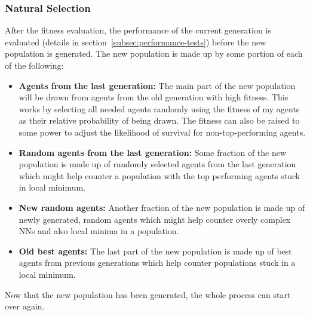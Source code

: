 \documentclass[11pt]{report}
\begin{document}
\begin{enumerate}
    \subsubsection{Natural Selection}
    After the fitness evaluation, the performance of the current generation is evaluated (details in section~\ref{subsec:performance-tests}) before the new population is generated.
    The new population is made up by some portion of each of the following:
    \begin{itemize}
        \item \textbf{Agents from the last generation:}
        The main part of the new population will be drawn from agents from the old generation with high fitness.
        This works by selecting all needed agents randomly using the fitness of my agents as their relative probability of being drawn.
        The fitness can also be raised to some power to adjust the likelihood of survival for non-top-performing agents.
        \item \textbf{Random agents from the last generation:}
        Some fraction of the new population is made up of randomly selected agents from the last generation which might help counter a population with the top performing agents stuck in local minimum.
        \item \textbf{New random agents:}
        Another fraction of the new population is made up of newly generated, random agents which might help counter overly complex NNs and also local minima in a population.
        \item \textbf{Old best agents:}
        The last part of the new population is made up of best agents from previous generations which help counter populations stuck in a local minimum.
    \end{itemize}
    Now that the new population has been generated, the whole process can start over again.


\end{enumerate}
\end{document}
